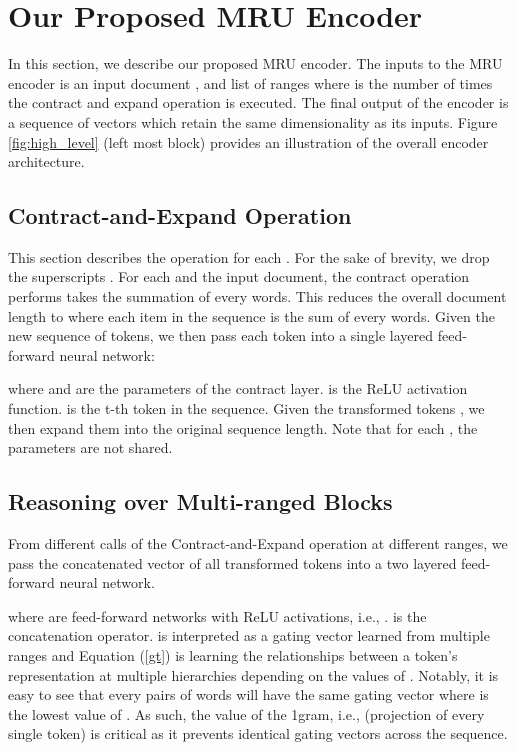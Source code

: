 \documentclass{article}
\begin{document}
\section{Our Proposed \textsc{MRU} Encoder}

In this section, we describe our proposed MRU encoder. The inputs to the MRU encoder is an input document , and list of ranges  where  is the number of times the contract and expand operation is executed. The final output of the encoder is a sequence of vectors which retain the same dimensionality as its inputs. Figure \ref{fig:high_level} (left most block) provides an illustration of the overall encoder architecture. 


\subsection{Contract-and-Expand Operation}
This section describes the operation for each . For the sake of brevity, we drop the superscripts . For each  and the input document, the contract operation performs takes the summation of every  words. This reduces the overall document length to
 where each item in the sequence is the sum of every  words. Given the new sequence of  tokens, we then pass each token into a single layered feed-forward neural network:

where  and  are the parameters of the contract layer.  is the ReLU activation function.  is the t-th token in the sequence. Given the transformed tokens , we then expand them into the original sequence length. Note that for each , the parameters  are not shared. 


\subsection{Reasoning over Multi-ranged Blocks}
From  different calls of the Contract-and-Expand operation at different ranges, we pass the concatenated vector of all transformed tokens into a two layered feed-forward neural network. 

where  are feed-forward networks with ReLU activations, i.e., .  is the concatenation operator.  is interpreted as a gating vector learned from multiple ranges and Equation (\ref{gt}) is learning the relationships between a token's representation at multiple hierarchies depending on the values of .  Notably, it is easy to see that every  pairs of words will have the same gating vector where  is the lowest value of . As such, the value of the 1gram, i.e.,  (projection of every single token) is critical as it prevents identical gating vectors across the sequence. 
\end{document}
